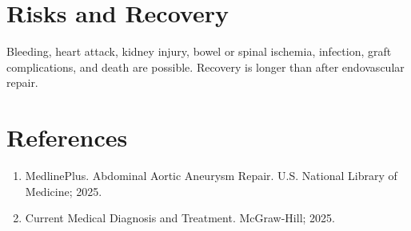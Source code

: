\section*{Risks and Recovery}
Bleeding, heart attack, kidney injury, bowel or spinal ischemia, infection, graft complications, and death are possible. Recovery is longer than after endovascular repair.
\section*{References}
\begin{enumerate}\item MedlinePlus. Abdominal Aortic Aneurysm Repair. U.S. National Library of Medicine; 2025.\item Current Medical Diagnosis and Treatment. McGraw-Hill; 2025.\end{enumerate}
\clearpage
